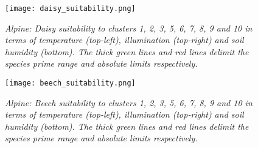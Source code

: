 \begin{figure}[htb!]
\center
	\texttt{[image: daisy\_suitability.png]}
	\caption{ \textit{Alpine: Daisy suitability to clusters 1, 2, 3, 5, 6, 7, 8, 9 and 10 in terms of temperature (top-left), illumination (top-right) and soil humidity (bottom). The thick green lines and red lines delimit the species prime range and absolute limits respectively.}}
	\label{fig:results_alpine_daisy_suitability}
\end{figure}

\begin{figure}[htb!]
\center
	\texttt{[image: beech\_suitability.png]}
	\caption{ \textit{Alpine: Beech suitability to clusters 1, 2, 3, 5, 6, 7, 8, 9 and 10 in terms of temperature (top-left), illumination (top-right) and soil humidity (bottom). The thick green lines and red lines delimit the species prime range and absolute limits respectively.}}
	\label{fig:results_alpine_beech_suitability}
\end{figure}

